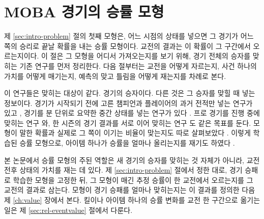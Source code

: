 \section{MOBA 경기의 승률 모형}
\label{sec:rel-winprob}

제 \ref{sec:intro-problem} 절의 첫째 모형은, 어느 시점의 상태를 넣으면 그 경기가 어느 쪽의 승리로 끝날 확률을 내는 승률 모형이다. 교전의 결과는 이 확률이 그 구간에서 오르는지이다. 이 절은 그 모형을 어디서 가져오는지를 보기 위해, 경기 전체의 승자를 맞히는 기존 연구를 먼저 정리한다. 다음 절부터는 교전을 어떻게 자르는지, 사건 하나의 가치를 어떻게 매기는지, 예측의 맞고 틀림을 어떻게 재는지를 차례로 본다.

이 연구들은 맞히는 대상이 같다. 경기의 승자이다. 다른 것은 그 승자를 맞힐 때 넣는 정보이다. 경기가 시작되기 전에 고른 챔피언과 플레이어의 과거 전적만 넣는 연구가 있고 \cite{costa2021,hitar2023}, 경기를 분 단위로 요약한 중간 상태를 넣는 연구가 있다 \cite{silva2018continuous}. 프로 경기를 진행 중에 맞히는 연구 \cite{hodge2021win}와, 한 시즌의 경기 결과를 서로 이어 맞히는 연구 \cite{bisberg2022}도 같은 목표를 둔다. 모형이 말한 확률과 실제로 그 쪽이 이기는 비율이 맞는지도 따로 살펴보았다 \cite{kim2020confidence}. 이렇게 학습된 승률 모형으로, 아이템 하나가 승률을 얼마나 올리는지를 재기도 하였다 \cite{jalovaara2024win}.

본 논문에서 승률 모형의 주된 역할은 새 경기의 승자를 맞히는 것 자체가 아니라, 교전 전후 상태의 가치를 재는 데 있다. 제 \ref{sec:intro-problem} 절에서 정한 대로, 경기 승패로 학습한 모형을 고정한 뒤, 그 모형이 매긴 추정 승률이 한 교전에서 오르는지를 그 교전의 결과로 삼는다. 모형이 경기 승패를 얼마나 맞히는지는 이 결과를 정의한 다음 제 \ref{ch:value} 장에서 본다. 킬이나 아이템 하나의 승률 변화를 교전 한 구간으로 옮기는 일은 제 \ref{sec:rel-eventvalue} 절에서 다룬다.
